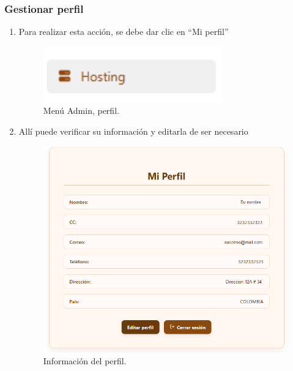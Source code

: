 \subsubsection {Gestionar perfil }

\begin{enumerate}
\item Para realizar esta acción, se debe dar clic en “Mi perfil”
\begin{figure}[H]
    \centering
    \includegraphics[width=0.3\linewidth]{guiamodulo/menu-admin-hosting.png}
    \caption{Menú Admin, perfil.}
    \label{fig:menu-admin-perfil}
\end{figure}

\item Allí puede verificar su información y editarla de ser necesario
\begin{figure}[H]
    \centering
    \includegraphics[width=0.6\linewidth]{guiamodulo/perfil-info.png}
    \caption{Información del perfil.}
    \label{fig:perfil-info}
\end{figure}
\end{enumerate}

